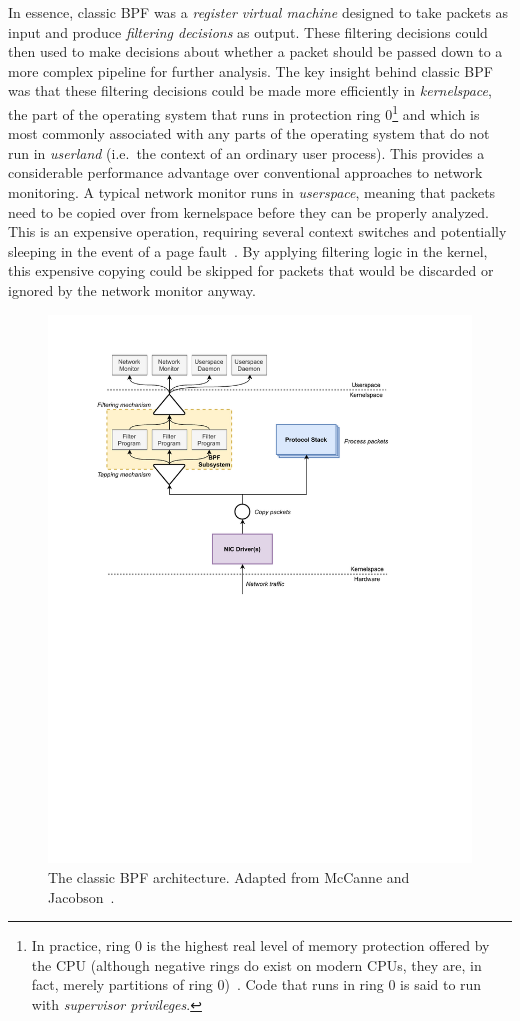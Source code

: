 In essence, classic BPF was a \textit{register virtual machine} designed to take packets
as input and produce \textit{filtering decisions} as output. These filtering decisions
could then used to make decisions about whether a packet should be passed down to a more
complex pipeline for further analysis. The key insight behind classic BPF was that these
filtering decisions could be made more efficiently in \textit{kernelspace}, the part of
the operating system that runs in protection ring 0\footnote{In practice, ring 0 is the
highest real level of memory protection offered by the CPU (although negative rings do
exist on modern CPUs, they are, in fact, merely partitions of ring 0)~. Code
that runs in ring 0 is said to run with \textit{supervisor privileges}.} and which is most
commonly associated with any parts of the operating system that do not run in
\textit{userland} (i.e.~the context of an ordinary user process). This provides
a considerable performance advantage over conventional approaches to network monitoring.
A typical network monitor runs in \textit{userspace}, meaning that packets need to be
copied over from kernelspace before they can be properly analyzed. This is an expensive
operation, requiring several context switches and potentially sleeping in the event of
a page fault~\cite{mccanne1993_bpf}. By applying filtering logic in the kernel, this
expensive copying could be skipped for packets that would be discarded or ignored by the
network monitor anyway.

\begin{figure}[htbp]
  \centering
  \includegraphics[width=0.8\linewidth]{figs/background/classic-bpf.pdf}
  \caption{The classic BPF architecture. Adapted from McCanne and Jacobson~\cite{mccanne1993_bpf}.}%
  \label{fig:classic-bpf}
\end{figure}

